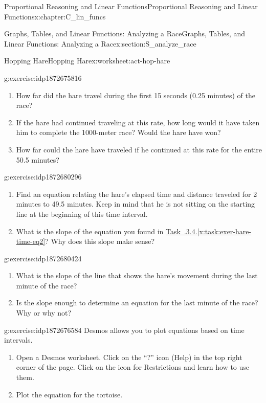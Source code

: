 \documentclass[oneside,10pt,]{book}
\newcommand{\xreffont}{\relax}
\numberwithin{equation}{chapter}
\begin{document}
\begin{chapterptx}{Proportional Reasoning and Linear Functions}{}{Proportional Reasoning and Linear Functions}{}{}{x:chapter:C_lin_funcs}
\begin{sectionptx}{Graphs, Tables, and Linear Functions: Analyzing a Race}{}{Graphs, Tables, and Linear Functions: Analyzing a Race}{}{}{x:section:S_analyze_race}
\begin{worksheet-subsection}{Hopping Hare}{}{Hopping Hare}{}{}{x:worksheet:act-hop-hare}
\begin{divisionexercise}{3}{}{}{g:exercise:idp1872675816}
\begin{enumerate}[font=\bfseries,label=(\alph*),ref=\alph*]
\item{}How far did the hare travel during the first 15 seconds (0.25 minutes) of the race?%
\item{}If the hare had continued traveling at this rate, how long would it have taken him to complete the 1000-meter race? Would the hare have won?%
\item{}How far could the hare have traveled if he continued at this rate for the entire 50.5 minutes?%
\end{enumerate}
\end{divisionexercise}%
\begin{divisionexercise}{4}{}{}{g:exercise:idp1872680296}%
\begin{enumerate}[font=\bfseries,label=(\alph*),ref=\alph*]
\item\label{x:task:exer-hare-time-eq2}Find an equation relating the hare's elapsed time and distance traveled for 2 minutes to 49.5 minutes. Keep in mind that he is not sitting on the starting line at the beginning of this time interval.%
\item{}What is the slope of the equation you found in \hyperref[x:task:exer-hare-time-eq2]{Task~{\xreffont 2.4.3.4}.{\xreffont\ref{x:task:exer-hare-time-eq2}}}? Why does this slope make sense?%
\end{enumerate}
\end{divisionexercise}%
\begin{divisionexercise}{5}{}{}{g:exercise:idp1872680424}%
\begin{enumerate}[font=\bfseries,label=(\alph*),ref=\alph*]
\item{}What is the slope of the line that shows the hare's movement during the last minute of the race?%
\item{}Is the slope enough to determine an equation for the last minute of the race? Why or why not?%
\end{enumerate}
\end{divisionexercise}%
\begin{divisionexercise}{6}{}{}{g:exercise:idp1872676584}%
Desmos allows you to plot equations based on time intervals.%
\begin{enumerate}[font=\bfseries,label=(\alph*),ref=\alph*]
\item{}Open a Desmos worksheet. Click on the ``?'' icon (Help) in the top right corner of the page. Click on the icon for Restrictions and learn how to use them.%
\item{}Plot the equation for the tortoise.%

\end{enumerate}
\end{divisionexercise}
\end{worksheet-subsection}
\end{sectionptx}
\end{chapterptx}
\end{document}
